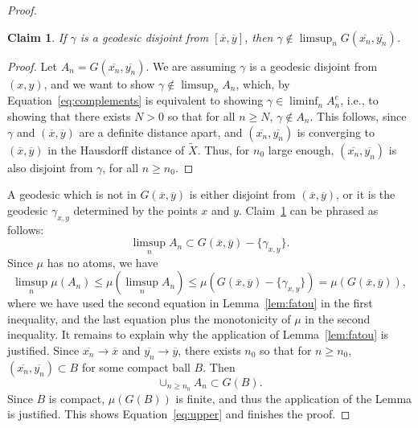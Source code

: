 \documentclass[12pt,article]{amsart}
\numberwithin{equation}{section}
\numberwithin{figure}{section}
\newtheorem{claim}[equation]{Claim}
\theoremstyle{definition}
\theoremstyle{plain}
\newcommand*{\wt}[1]{\widetilde{#1}}
\begin{document}
\begin{proof}
\begin{claim}
If $\gamma$ is a geodesic disjoint from $[\overline{x},\overline{y}]$, then $\gamma \notin \limsup_{n} G(\overline{x_n},\overline{y_n})$.
\label{claim:upper}
\end{claim}
\begin{proof}
Let $A_n=G(\overline{x_n},\overline{y_n})$.
We are assuming $\gamma$ is a geodesic disjoint from $(x,y)$, and we want to show  $\gamma \notin \limsup_{n} A_n$, which, by Equation~\ref{eq:complements} is equivalent to showing
$\gamma \in \liminf_n A_n^c$, i.e., to showing that there exists $N > 0$ so that for all $n \geq N$, $\gamma \notin A_n$.
This follows, since $\gamma$ and $(\overline{x},\overline{y})$ are a definite distance apart, and $(\overline{x_n},\overline{y_n})$ is converging to $(\overline{x},\overline{y})$ in the Hausdorff distance of $\wt{X}$. Thus, for $n_0$ large enough, $(\overline{x_n},\overline{y_n})$ is also disjoint from $\gamma$, for all $n \geq n_0$.
\end{proof}
A geodesic which is not in $G(\overline{x},\overline{y})$ is either disjoint from $(\overline{x},\overline{y})$, or it is the geodesic $\gamma_{x,y}$ determined by the points $x$ and $y$.
Claim~\ref{claim:upper} can be phrased as follows:
\[
\limsup_{n}  A_n \subset G(\overline{x},\overline{y}) - \{ \gamma_{x,y} \}.
\]
Since $\mu$ has no atoms, we have
\[
\limsup_{n}  \mu(A_n ) \leq \mu(\limsup_{n} A_n ) \leq \mu( G(\overline{x},\overline{y}) - \{ \gamma_{x,y} \} ) = \mu( G(\overline{x},\overline{y})),
\]
where we have used the second equation in Lemma~\ref{lem:fatou} in the first inequality, and the last equation plus the monotonicity of $\mu$ in the second inequality.
It remains to explain why the application of Lemma~\ref{lem:fatou} is justified. Since $\overline{x_n} \to \overline{x}$ and $\overline{y_n} \to \overline{y}$, there exists $n_0$ so that for $n \geq n_0$, $(\overline{x_n},\overline{y_n}) \subset B$ for some compact ball $B$. Then \[\cup_{n \geq n_0} A_n \subset G(B).\]
Since $B$ is compact, $\mu(G(B))$ is finite, and thus the application of the Lemma is justified.
This shows Equation~\ref{eq:upper} and finishes the proof.
\end{proof}
\end{document}

